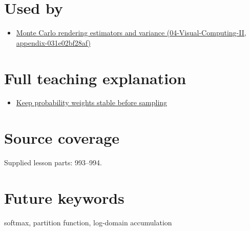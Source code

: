 \section{Used by}\label{appendix-d580b422240f-used-by}

\begin{itemize}
\tightlist
\item
  \href{../04-Visual-Computing-II/main.pdf\#nameddest=appendix-031e02bf28af}{Monte Carlo rendering estimators and variance (04-Visual-Computing-II, appendix-031e02bf28af)}
\end{itemize}

\section{Full teaching explanation}\label{appendix-d580b422240f-full-teaching-explanation}

\begin{itemize}
\tightlist
\item
  \href{Continuous\%20Notes/Computing\%20Foundations\%20-\%20From\%20Bits\%20to\%20C++\%20and\%20Systems\%20APIs\#Keep\%20probability\%20weights\%20stable\%20before\%20sampling}{Keep probability weights stable before sampling}
\end{itemize}

\section{Source coverage}\label{appendix-d580b422240f-source-coverage}

Supplied lesson parts: 993--994.

\section{Future keywords}\label{appendix-d580b422240f-future-keywords}

softmax, partition function, log-domain accumulation
